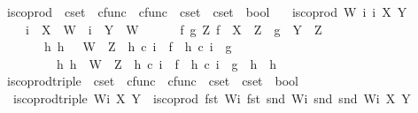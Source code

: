 \begin{isabellebody}
\isanewline
{}\isamarkupfalse%
\ is{\isacharunderscore}{\kern0pt}coprod\ {\isacharcolon}{\kern0pt}{\isacharcolon}{\kern0pt}\ {\isachardoublequoteopen}cset\ {\isasymRightarrow}\ cfunc\ {\isasymRightarrow}\ cfunc\ {\isasymRightarrow}\ cset\ {\isasymRightarrow}\ cset\ {\isasymRightarrow}\ bool{\isachardoublequoteclose}\ \isanewline
\ \ {\isachardoublequoteopen}is{\isacharunderscore}{\kern0pt}coprod\ W\ i\ i\ X\ Y\ {\isasymlongleftrightarrow}\ \isanewline
\ \ \ \ {\isacharparenleft}{\kern0pt}i\ {\isacharcolon}{\kern0pt}\ X\ {\isasymrightarrow}\ W\ {\isasymand}\ i\ {\isacharcolon}{\kern0pt}\ Y\ {\isasymrightarrow}\ W\ {\isasymand}\isanewline
\ \ \ \ {\isacharparenleft}{\kern0pt}{\isasymforall}\ f\ g\ Z{\isachardot}{\kern0pt}\ {\isacharparenleft}{\kern0pt}f\ {\isacharcolon}{\kern0pt}\ X\ {\isasymrightarrow}\ Z\ {\isasymand}\ g\ {\isacharcolon}{\kern0pt}\ Y\ {\isasymrightarrow}\ Z{\isacharparenright}{\kern0pt}\ {\isasymlongrightarrow}\ \isanewline
\ \ \ \ \ \ {\isacharparenleft}{\kern0pt}{\isasymexists}\ h{\isachardot}{\kern0pt}\ h\ {\isacharcolon}{\kern0pt}\ \ W\ {\isasymrightarrow}\ Z\ {\isasymand}\ h\ {\isasymcirc}\isactrlsub c\ i\ {\isacharequal}{\kern0pt}\ f\ {\isasymand}\ h\ {\isasymcirc}\isactrlsub c\ i\ {\isacharequal}{\kern0pt}\ g\ {\isasymand}\isanewline
\ \ \ \ \ \ \ \ {\isacharparenleft}{\kern0pt}{\isasymforall}\ h{}{\isachardot}{\kern0pt}\ {\isacharparenleft}{\kern0pt}h{}\ {\isacharcolon}{\kern0pt}\ W\ {\isasymrightarrow}\ Z\ {\isasymand}\ h{}\ {\isasymcirc}\isactrlsub c\ i\ {\isacharequal}{\kern0pt}\ f\ {\isasymand}\ h{}\ {\isasymcirc}\isactrlsub c\ i\ {\isacharequal}{\kern0pt}\ g{\isacharparenright}{\kern0pt}\ {\isasymlongrightarrow}\ h{}\ {\isacharequal}{\kern0pt}\ h{\isacharparenright}{\kern0pt}{\isacharparenright}{\kern0pt}{\isacharparenright}{\kern0pt}{\isacharparenright}{\kern0pt}{\isachardoublequoteclose}\isanewline
\isanewline
{}\isamarkupfalse%
\ is{\isacharunderscore}{\kern0pt}coprod{\isacharunderscore}{\kern0pt}triple\ {\isacharcolon}{\kern0pt}{\isacharcolon}{\kern0pt}\ {\isachardoublequoteopen}cset\ {\isasymtimes}\ cfunc\ {\isasymtimes}\ cfunc\ {\isasymRightarrow}\ cset\ {\isasymRightarrow}\ cset\ {\isasymRightarrow}\ bool{\isachardoublequoteclose}\ \isanewline
\ \ {\isachardoublequoteopen}is{\isacharunderscore}{\kern0pt}coprod{\isacharunderscore}{\kern0pt}triple\ Wi\ X\ Y\ {\isasymequiv}\ is{\isacharunderscore}{\kern0pt}coprod\ {\isacharparenleft}{\kern0pt}fst\ Wi{\isacharparenright}{\kern0pt}\ {\isacharparenleft}{\kern0pt}fst\ {\isacharparenleft}{\kern0pt}snd\ Wi{\isacharparenright}{\kern0pt}{\isacharparenright}{\kern0pt}\ {\isacharparenleft}{\kern0pt}snd\ {\isacharparenleft}{\kern0pt}snd\ Wi{\isacharparenright}{\kern0pt}{\isacharparenright}{\kern0pt}\ X\ Y{\isachardoublequoteclose}\isanewline

\end{isabellebody}
